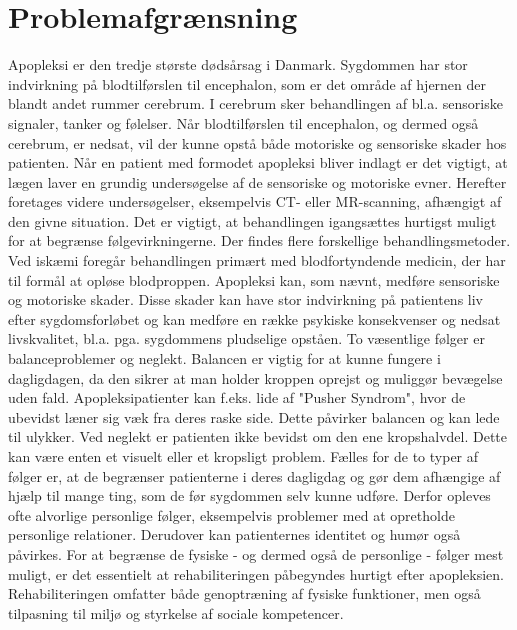 \section{Problemafgrænsning}
Apopleksi er den tredje største dødsårsag i Danmark. 
Sygdommen har stor indvirkning på blodtilførslen til encephalon, som er det område af hjernen der blandt andet rummer cerebrum. I cerebrum sker behandlingen af bl.a. sensoriske signaler, tanker og følelser. Når blodtilførslen til encephalon, og dermed også cerebrum, er nedsat, vil der kunne opstå både motoriske og sensoriske skader hos patienten. 
Når en patient med formodet apopleksi bliver indlagt er det vigtigt, at lægen laver en grundig undersøgelse af de sensoriske og motoriske evner. Herefter foretages videre undersøgelser, eksempelvis CT- eller MR-scanning, afhængigt af den givne situation. Det er vigtigt, at behandlingen igangsættes hurtigst muligt for at begrænse følgevirkningerne. Der findes flere forskellige behandlingsmetoder. Ved iskæmi foregår behandlingen primært med blodfortyndende medicin, der har til formål at opløse blodproppen. 
Apopleksi kan, som nævnt, medføre sensoriske og motoriske skader. Disse skader kan have stor indvirkning på patientens liv efter sygdomsforløbet og kan medføre en række psykiske konsekvenser og nedsat livskvalitet, bl.a. pga. sygdommens pludselige opståen.
To væsentlige følger er balanceproblemer og neglekt. Balancen er vigtig for at kunne fungere i dagligdagen, da den sikrer at man holder kroppen oprejst og muliggør bevægelse uden fald. Apopleksipatienter kan f.eks. lide af "Pusher Syndrom", hvor de ubevidst læner sig væk fra deres raske side. Dette påvirker balancen og kan lede til ulykker. Ved neglekt er patienten ikke bevidst om den ene kropshalvdel. Dette kan være enten et visuelt eller et kropsligt problem.
Fælles for de to typer af følger er, at de begrænser patienterne i deres dagligdag og gør dem afhængige af hjælp til mange ting, som de før sygdommen selv kunne udføre. Derfor opleves ofte alvorlige personlige følger, eksempelvis problemer med at opretholde personlige relationer. Derudover kan patienternes identitet og humør også påvirkes. 
For at begrænse de fysiske - og dermed også de personlige - følger mest muligt, er det essentielt at rehabiliteringen påbegyndes hurtigt efter apopleksien. Rehabiliteringen omfatter både genoptræning af fysiske funktioner, men også tilpasning til miljø og styrkelse af sociale kompetencer. 
